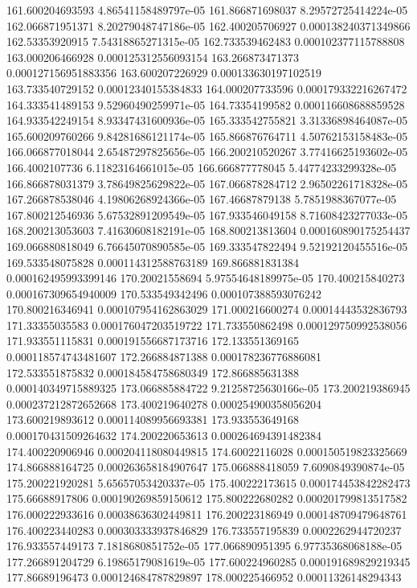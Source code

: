 {161.600204693593 4.86541158489797e-05
161.866871698037 8.29572725414224e-05
162.066871951371 8.20279048747186e-05
162.400205706927 0.000138240371349866
162.53353920915 7.54318865271315e-05
162.733539462483 0.000102377115788808
163.000206466928 0.000125312556093154
163.266873471373 0.000127156951883356
163.600207226929 0.000133630197102519
163.733540729152 0.00012340155384833
164.000207733596 0.000179332216267472
164.333541489153 9.52960490259971e-05
164.73354199582 0.000116608688859528
164.933542249154 8.93347431600936e-05
165.333542755821 3.31336898464087e-05
165.600209760266 9.84281686121174e-05
165.866876764711 4.50762153158483e-05
166.066877018044 2.65487297825656e-05
166.200210520267 3.77416625193602e-05
166.4002107736 6.11823164661015e-05
166.666877778045 5.44774233299328e-05
166.866878031379 3.78649825629822e-05
167.066878284712 2.96502261718328e-05
167.266878538046 4.19806268924366e-05
167.46687879138 5.7851988367077e-05
167.800212546936 5.67532891209549e-05
167.933546049158 8.71608423277033e-05
168.200213053603 7.41630608182191e-05
168.800213813604 0.000160890175254437
169.066880818049 6.76645070890585e-05
169.333547822494 9.52192120455516e-05
169.533548075828 0.000114312588763189
169.866881831384 0.000162495993399146
170.20021558694 5.97554648189975e-05
170.400215840273 0.000167309654940009
170.533549342496 0.000107388593076242
170.800216346941 0.000107954162863029
171.000216600274 0.00014443532836793
171.33355035583 0.000176047203519722
171.733550862498 0.000129750992538056
171.933551115831 0.000191556687173716
172.133551369165 0.000118574743481607
172.266884871388 0.000178236776886081
172.533551875832 0.000184584758680349
172.866885631388 0.000140349715889325
173.066885884722 9.21258725630166e-05
173.200219386945 0.000237212872652668
173.400219640278 0.000254900358056204
173.600219893612 0.000114089956693381
173.933553649168 0.000170431509264632
174.200220653613 0.000264694391482384
174.400220906946 0.000204118080449815
174.60022116028 0.000150519823325669
174.866888164725 0.000263658184907647
175.066888418059 7.6090849390874e-05
175.200221920281 5.65657053420337e-05
175.400222173615 0.000174453842282473
175.66688917806 0.000190269859150612
175.800222680282 0.000201799813517582
176.000222933616 0.00038636302449811
176.200223186949 0.000148709479648761
176.400223440283 0.000303333937846829
176.733557195839 0.0002262944720237
176.933557449173 7.1818680851752e-05
177.066890951395 6.97735368068188e-05
177.266891204729 6.19865179081619e-05
177.600224960285 0.000191689829219345
177.86689196473 0.000124684787829897
178.000225466952 0.00011326148294343
}
